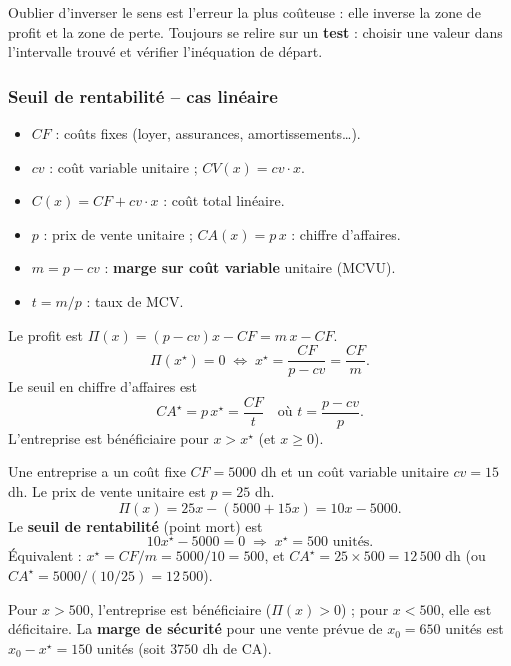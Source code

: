 \documentclass[12pt,a4paper]{article}
\begin{document}
\begin{attentionbox}
Oublier d'inverser le sens est l'erreur la plus coûteuse : elle inverse la zone de profit et la zone de perte. Toujours se relire sur un \textbf{test} : choisir une valeur dans l'intervalle trouvé et vérifier l'inéquation de départ.
\end{attentionbox}

\subsubsection{Seuil de rentabilité -- cas linéaire}

\begin{gestionbox}
\begin{itemize}[leftmargin=1.2cm]
  \item $CF$ : coûts fixes (loyer, assurances, amortissements\ldots).
  \item $cv$ : coût variable unitaire ; $CV(x)=cv\cdot x$.
  \item $C(x)=CF+cv\cdot x$ : coût total linéaire.
  \item $p$ : prix de vente unitaire ; $CA(x)=p\,x$ : chiffre d'affaires.
  \item $m = p-cv$ : \textbf{marge sur coût variable} unitaire (MCVU).
  \item $t = m/p$ : taux de MCV.
\end{itemize}
\end{gestionbox}

\begin{propbox}
Le profit est $\Pi(x)=(p-cv)x-CF = m\,x - CF$.
$$\Pi(x^\star)=0 \;\Longleftrightarrow\; x^\star = \frac{CF}{p-cv} = \frac{CF}{m}.$$
Le seuil en chiffre d'affaires est
$$CA^\star = p\,x^\star = \frac{CF}{t} \quad \text{où } t=\frac{p-cv}{p}.$$
L'entreprise est bénéficiaire pour $x > x^\star$ (et $x\geqslant 0$).
\end{propbox}

\begin{exemplebox}
Une entreprise a un coût fixe $CF = 5000$ dh et un coût variable unitaire $cv = 15$ dh. Le prix de vente unitaire est $p = 25$ dh.
$$\Pi(x) = 25x - (5000 + 15x) = 10x - 5000.$$
Le \textbf{seuil de rentabilité} (point mort) est
$$10x^\star - 5000 = 0 \;\Longrightarrow\; x^\star = 500 \text{ unités.}$$
Équivalent : $x^\star = CF/m = 5000/10 = 500$, et $CA^\star = 25\times 500 = 12\,500$ dh (ou $CA^\star = 5000 / (10/25) = 12\,500$).

Pour $x>500$, l'entreprise est bénéficiaire ($\Pi(x)>0$) ; pour $x<500$, elle est déficitaire. La \textbf{marge de sécurité} pour une vente prévue de $x_0=650$ unités est $x_0-x^\star=150$ unités (soit $3750$ dh de CA).
\end{exemplebox}
\end{document}
